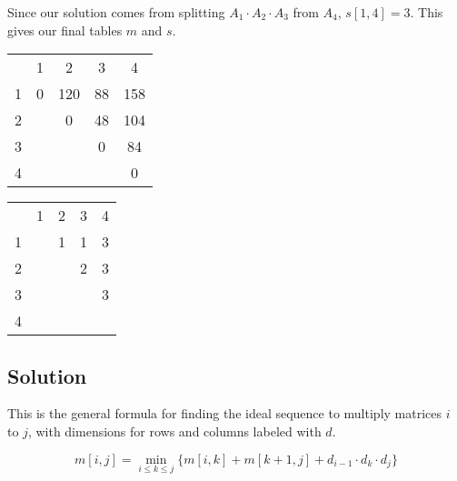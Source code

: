\documentclass[12pt]{article}
\begin{document}
Since our solution comes from splitting $A_1 \cdot A_2 \cdot A_3$ from $A_4$, $s[1, 4] = 3$. This gives our final tables $m$ and $s$.

\begin{center}
\label*{$m$}
\begin{tabular}{ c|c|c|c|c| }
    \multicolumn{1}{c}{}
    & \multicolumn{1}{c}{1}
    & \multicolumn{1}{c}{2}
    & \multicolumn{1}{c}{3}
    & \multicolumn{1}{c}{4}\\

    \cline{2-5}
        1 & 0 & 120 & 88 & 158 \\
    \cline{2-5}
        2 &  & 0 & 48 & 104 \\
    \cline{2-5}
        3 &  &  & 0 & 84 \\
    \cline{2-5}
        4 &  &  &  & 0 \\
    \cline{2-5}
\end{tabular}
\end{center}

\begin{center}
\label*{$s$}
\begin{tabular}{ c|c|c|c|c| }
    \multicolumn{1}{c}{}
    & \multicolumn{1}{c}{1}
    & \multicolumn{1}{c}{2}
    & \multicolumn{1}{c}{3}
    & \multicolumn{1}{c}{4}\\

    \cline{2-5}
        1 &  & 1 & 1 & 3 \\
    \cline{2-5}
        2 &  &  & 2 & 3 \\
    \cline{2-5}
        3 &  &  &  & 3 \\
    \cline{2-5}
        4 &  &  &  &  \\
    \cline{2-5}
\end{tabular}
\end{center}

\newpage

\subsection*{Solution}
This is the general formula for finding the ideal sequence to multiply matrices $i$ to $j$, with dimensions for rows and columns labeled with $d$.

\begin{equation*}
    m[i, j] = \min_{i \leq k \leq j}\{ m[i, k] + m[k+1, j] + d_{i-1} \cdot d_k \cdot d_j \}
\end{equation*}
\end{document}
